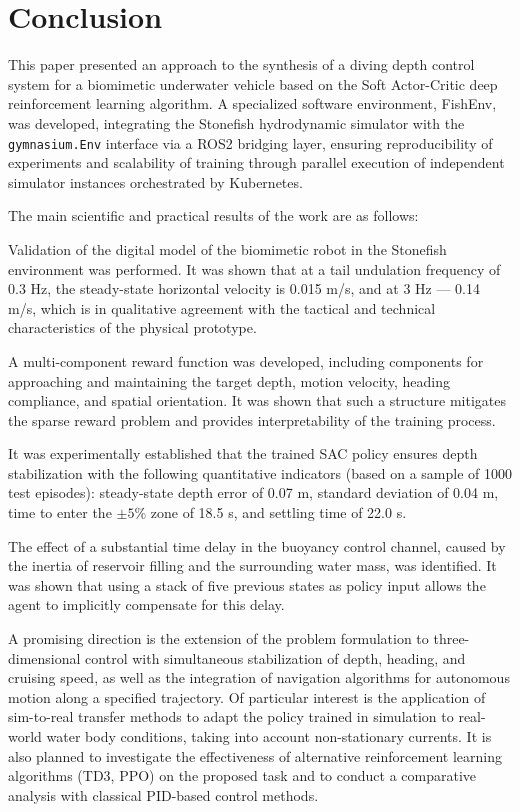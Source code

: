 \documentclass[12pt]{revtex4}
\begin{document}
\section{Conclusion}

This paper presented an approach to the synthesis of a diving depth control system for a biomimetic underwater vehicle based on the Soft Actor-Critic deep reinforcement learning algorithm. A specialized software environment, FishEnv, was developed, integrating the Stonefish hydrodynamic simulator with the \texttt{gymnasium.Env} interface via a ROS2 bridging layer, ensuring reproducibility of experiments and scalability of training through parallel execution of independent simulator instances orchestrated by Kubernetes.

The main scientific and practical results of the work are as follows:

Validation of the digital model of the biomimetic robot in the Stonefish environment was performed. It was shown that at a tail undulation frequency of 0.3 Hz, the steady-state horizontal velocity is 0.015 m/s, and at 3 Hz --- 0.14 m/s, which is in qualitative agreement with the tactical and technical characteristics of the physical prototype.

A multi-component reward function was developed, including components for approaching and maintaining the target depth, motion velocity, heading compliance, and spatial orientation. It was shown that such a structure mitigates the sparse reward problem and provides interpretability of the training process.

It was experimentally established that the trained SAC policy ensures depth stabilization with the following quantitative indicators (based on a sample of 1000 test episodes): steady-state depth error of 0.07 m, standard deviation of 0.04 m, time to enter the $\pm 5\%$ zone of 18.5 s, and settling time of 22.0 s.

The effect of a substantial time delay in the buoyancy control channel, caused by the inertia of reservoir filling and the surrounding water mass, was identified. It was shown that using a stack of five previous states as policy input allows the agent to implicitly compensate for this delay.

A promising direction is the extension of the problem formulation to three-dimensional control with simultaneous stabilization of depth, heading, and cruising speed, as well as the integration of navigation algorithms for autonomous motion along a specified trajectory. Of particular interest is the application of sim-to-real transfer methods to adapt the policy trained in simulation to real-world water body conditions, taking into account non-stationary currents. It is also planned to investigate the effectiveness of alternative reinforcement learning algorithms (TD3, PPO) on the proposed task and to conduct a comparative analysis with classical PID-based control methods.
\end{document}
